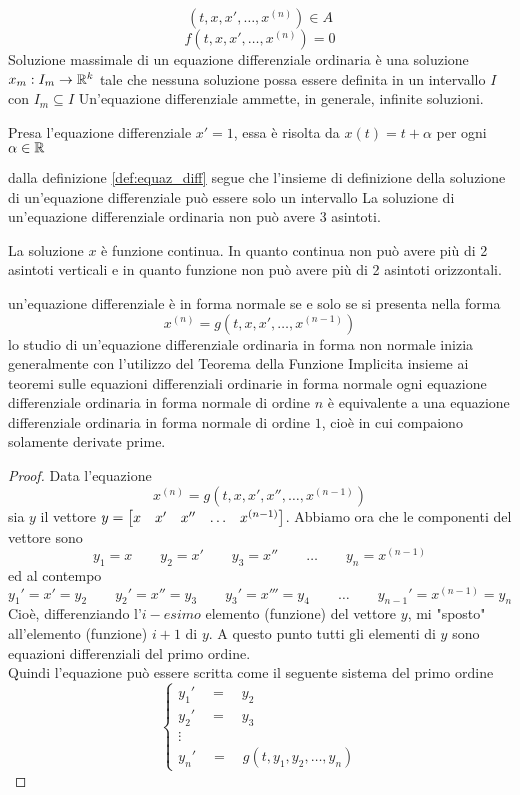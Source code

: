 $$ (t,x, x',\ldots,x^{(n)}) \in A$$
$$ f(t,x, x',\ldots,x^{(n)})=0$$
Soluzione massimale  di un equazione differenziale ordinaria è una soluzione $x_m:I_m\to \mathbb{R}^k$ tale che nessuna soluzione possa essere definita in un intervallo $I$ con $I_m\subseteq I$
\note
Un'equazione differenziale ammette, in generale, infinite soluzioni.
\begin{example}
	Presa l'equazione differenziale $ x'=1$, essa è risolta da $x(t) = t + \alpha$ per ogni $\alpha\in\mathbb{R}$
\end{example}
\note
dalla definizione \ref{def:equaz_diff} segue che l'insieme di definizione della soluzione di un'equazione differenziale può essere solo un intervallo
\exercise
La soluzione di un'equazione differenziale ordinaria non può avere 3 asintoti.
\begin{exercise_answer}
	La soluzione $x$ è funzione continua. In quanto continua non può avere più di 2 asintoti verticali e in quanto funzione non può avere più di 2 asintoti orizzontali.
\end{exercise_answer}
un'equazione differenziale è in forma normale  se e solo se si presenta nella forma 
$$x^{(n)} = g(t,x, x',\ldots,x^{(n-1)})$$
\observation
lo studio di un'equazione differenziale ordinaria in forma non normale inizia generalmente con l'utilizzo del Teorema della Funzione Implicita insieme ai teoremi sulle equazioni differenziali ordinarie in forma normale
\proposition
ogni equazione differenziale ordinaria in forma normale di ordine $n$ è equivalente a una equazione differenziale ordinaria in forma normale di ordine $1$, cioè in cui compaiono solamente derivate prime.
\begin{proof}
	Data l'equazione
	$$x^{(n)} = g(t,x, x', x'',\ldots,x^{(n-1)})$$
	sia $y$ il vettore $y = \begin{bmatrix} x &  x' &  x'' & \ldots & x^{(n-1)} \end{bmatrix}$. Abbiamo ora che le componenti del vettore sono
	$$y_1=x\qquad y_2= x'\qquad y_3= x''\qquad \ldots\qquad y_n=x^{(n-1)}$$
	ed al contempo
	$$y_1'= x'=y_2\qquad y_2'= x''=y_3\qquad y_3'= x'''=y_4\qquad\ldots\qquad y_{n-1}'=x^{(n-1)}=y_n$$
	Cioè, differenziando l'$i-esimo$ elemento (funzione) del vettore $y$, mi "sposto" all'elemento (funzione) $i+1$ di $y$. A questo punto tutti gli elementi di $y$ sono equazioni differenziali del primo ordine.\\
	Quindi l'equazione può essere scritta come il seguente sistema del primo ordine
	$$\begin{cases}y_1'\quad=\quad y_2\\y_2'\quad=\quad y_3\\\vdots\\y_n'\quad=\quad g(t, y_1, y_2,\dots,y_n)\end{cases}$$
\end{proof}
